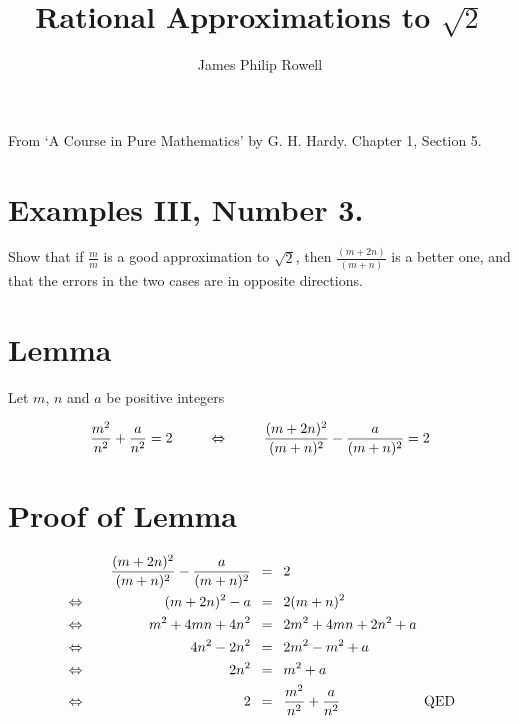 \documentclass{article}
\author{James Philip Rowell}
\title{\vspace{-1.5cm}Rational Approximations to $\sqrt{2}$}
\date{} %
\begin{document}
\maketitle
\begin{em}
\centerline{\small{}From `A Course in Pure Mathematics' by G. H. Hardy. Chapter 1, Section 5.}
\end{em}
\bigskip

\section*{Examples III, Number 3.}

Show that if $\frac{m}{m}$ is a good approximation to $\sqrt{2}$, then 
$\frac{(m+2n)}{(m+n)}$ is a better one, and that the errors in the 
two cases are in opposite directions.

\section*{Lemma}

Let $m$, $n$ and $a$ be positive integers

\[\frac{m^2}{n^2}+\frac{a}{n^2}=2 \text{\hspace{2.5em}} \Leftrightarrow \text{\hspace{2.5em}}\frac{(m+2n)^2}{(m+n)^2}-\frac{a}{(m+n)^2}=2\]

\section*{Proof of Lemma}

\begin{alignat*}{2}
  &&\frac{(m+2n)^2}{(m+n)^2}-\frac{a}{(m+n)^2}
  \text{\hspace{0.5em}}&=\text{\hspace{0.5em}}
  2\\
  &\Leftrightarrow\quad
  &(m+2n)^2 - a
  \text{\hspace{0.5em}}&=\text{\hspace{0.5em}}
  2(m+n)^2\\
  &\Leftrightarrow\quad
  &m^2 + 4mn + 4n^2
  \text{\hspace{0.5em}}&=\text{\hspace{0.5em}}
  2m^2 + 4mn + 2n^2 + a\\
  &\Leftrightarrow\quad
  &4n^2 - 2n^2
  \text{\hspace{0.5em}}&=\text{\hspace{0.5em}}
  2m^2 - m^2 + a\\
  &\Leftrightarrow\quad
  &2n^2
  \text{\hspace{0.5em}}&=\text{\hspace{0.5em}}
  m^2 + a\\
  &\Leftrightarrow\quad
  &2
  \text{\hspace{0.5em}}&=\text{\hspace{0.5em}}
  \frac{m^2}{n^2}+\frac{a}{n^2}\text{\hspace{6.0em}QED}\\
\end{alignat*}
\end{document}
